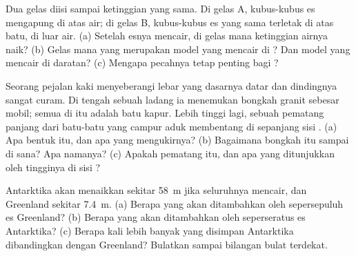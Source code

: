 \begin{exercise}[$\star\star$]\label{exo:g8:ice-on-earth:8}
Dua gelas diisi sampai ketinggian yang sama. Di gelas A, kubus-kubus es
mengapung di atas air; di gelas B, kubus-kubus es yang sama terletak di
atas batu, di luar air. (a) Setelah esnya mencair, di gelas mana
ketinggian airnya naik? (b) Gelas mana yang merupakan model 
yang mencair di ? Dan model  yang mencair di daratan?
(c) Mengapa pecahnya  tetap penting bagi  ?
\end{exercise}

\begin{exercise}[$\star\star$]\label{exo:g8:ice-on-earth:9}
Seorang pejalan kaki menyeberangi  lebar yang dasarnya datar dan
dindingnya sangat curam. Di tengah sebuah ladang ia menemukan bongkah
granit sebesar mobil; semua  di  itu adalah batu kapur. Lebih
tinggi lagi, sebuah pematang panjang dari batu-batu yang campur aduk
membentang di sepanjang sisi . (a) Apa bentuk  itu, dan apa
yang mengukirnya? (b) Bagaimana bongkah itu sampai di sana? Apa namanya?
(c) Apakah pematang itu, dan apa yang ditunjukkan oleh tingginya di sisi
?
\end{exercise}

\begin{exercise}[$\star\star$]\label{exo:g8:ice-on-earth:10}
 Antarktika akan menaikkan  sekitar \qty{58}{m}
jika seluruhnya mencair, dan  Greenland sekitar \qty{7.4}{m}.
(a) Berapa yang akan ditambahkan oleh sepersepuluh es Greenland? (b) Berapa
yang akan ditambahkan oleh seperseratus es Antarktika? (c) Berapa kali
lebih banyak yang disimpan Antarktika dibandingkan dengan Greenland?
Bulatkan sampai bilangan bulat terdekat.
\end{exercise}

